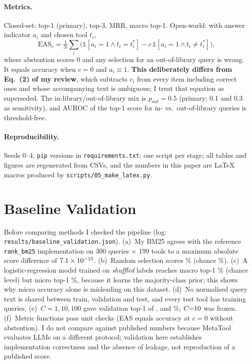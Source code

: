 \documentclass[10pt,twocolumn]{article}
\begin{document}
\paragraph{Metrics.} Closed-set: top-1 (primary), top-3, MRR, macro top-1. Open-world: with answer indicator $a_i$ and chosen tool $t_i$,
\begin{equation}
\mathrm{EAS}_c=\tfrac1N\textstyle\sum_i\big(\mathbb 1[a_i{=}1\wedge t_i{=}t^*_i]-c\,\mathbb 1[a_i{=}1\wedge t_i{\ne}t^*_i]\big),
\end{equation}
where abstention scores 0 and any selection for an out-of-library query is wrong. It equals accuracy when $c{=}0$ and $a_i{\equiv}1$. \textbf{This deliberately differs from Eq.~(2) of my review}, which subtracts $c_i$ from every item including correct ones and whose accompanying text is ambiguous; I treat that equation as superseded. The in-library/out-of-library mix is $p_{out}{=}0.5$ (primary; 0.1 and 0.3 as sensitivity), and AUROC of the top-1 score for in- vs.\ out-of-library queries is threshold-free.

\paragraph{Reproducibility.} Seeds 0--4; \texttt{pip} versions in \texttt{requirements.txt}; one script per stage; all tables and figures are regenerated from CSVs, and the numbers in this paper are LaTeX macros produced by \texttt{scripts/05\_make\_latex.py}.



\section{Baseline Validation}\label{sec:val}
Before comparing methods I checked the pipeline (log: \texttt{results/baseline\_validation.json}). (a)~My BM25 agrees with the reference \texttt{rank\_bm25} implementation on 300 queries $\times$ 199 tools to a maximum absolute score difference of $7.1\times 10^{-15}$. (b)~Random selection scores \VrandTop\% (chance \VchanceTop\%). (c)~A logistic-regression model trained on \emph{shuffled} labels reaches macro top-1 \VshufMacro\% (chance level) but micro top-1 \VshufTop\%, because it learns the majority-class prior; this shows why micro accuracy alone is misleading on this dataset. (d)~No normalised query text is shared between train, validation and test, and every test tool has training queries. (e)~$C{=}1,10,100$ gave validation top-1 of \VvalCI, \VvalCIO{} and \VvalCIOO\%; $C{=}10$ was frozen. (f)~Metric functions pass unit checks (EAS equals accuracy at $c{=}0$ without abstention). I do not compare against published numbers because MetaTool evaluates LLMs on a different protocol; validation here establishes implementation correctness and the absence of leakage, not reproduction of a published score.
\end{document}
